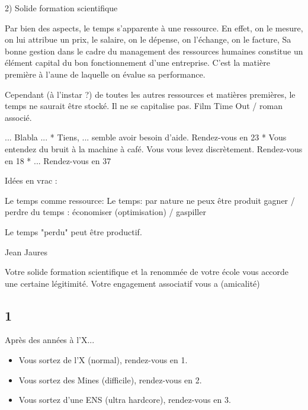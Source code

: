 \documentclass[12pt,a4paper,titlepage]{article}
\begin{document}
\begin{multicols}{2}
2) Solide formation scientifique


Par bien des aspects, le temps s'apparente à une ressource.
En effet, on le mesure, on lui attribue un prix, le salaire, on le dépense, on l'échange, on le facture,
Sa bonne gestion dans le cadre du management des ressources humaines constitue un élément capital du bon fonctionnement d'une entreprise. C'est la matière première à l'aune de laquelle on évalue sa performance.

Cependant (à l'instar ?) de toutes les autres ressources et matières premières, le temps ne saurait être stocké.
Il ne se capitalise pas.
Film Time Out / roman associé.










... Blabla ...
* Tiens, ... semble avoir besoin d'aide. Rendez-vous en 23
* Vous entendez du bruit à la machine à café. Vous vous levez discrètement. Rendez-vous en 18
* ... Rendez-vous en 37


Idées en vrac :

Le temps comme ressource:
Le temps: par nature ne peux être produit
gagner / perdre du temps : économiser (optimisation) / gaspiller

Le temps "perdu" peut être productif.

Jean Jaures

Votre solide formation scientifique et la renommée de votre école vous accorde une certaine légitimité. Votre engagement associatif vous a  (amicalité)




\label{n1}
\subsection*{1}
Après des années à l'X... \\
\begin{itemize}
\item Vous sortez de l'X (normal), rendez-vous en 1.
\item Vous sortez des Mines (difficile), rendez-vous en 2.
\item Vous sortez d'une ENS (ultra hardcore), rendez-vous en 3.
\end{itemize}



\end{multicols}
\end{document}
